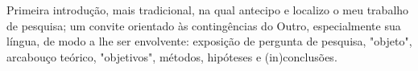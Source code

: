 









\indent


Primeira introdução, mais tradicional, na qual antecipo e localizo o meu trabalho de pesquisa;
    um convite orientado às contingências do Outro, especialmente sua língua, de modo a lhe ser envolvente:
        exposição de pergunta de pesquisa, "objeto", arcabouço teórico, "objetivos", métodos, hipóteses e (in)conclusões.

